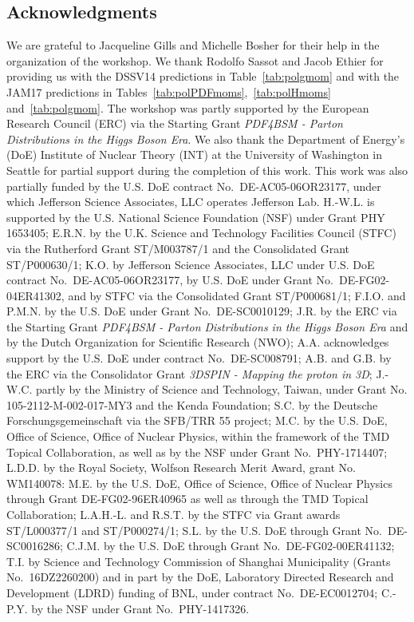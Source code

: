 \subsection*{Acknowledgments}

We are grateful to Jacqueline Gills and Michelle Bosher for their help in the
organization of the workshop.
%
We thank Rodolfo Sassot and Jacob Ethier for providing us with the 
DSSV14 predictions in Table~\ref{tab:polgmom} and with the JAM17 predictions in
Tables~\ref{tab:polPDFmoms},~\ref{tab:polHmoms} and~\ref{tab:polgmom}.
%
The workshop was partly supported by the European Research Council (ERC) via 
the Starting Grant {\it PDF4BSM - Parton Distributions in the Higgs Boson Era}.
%
We also thank the Department of Energy's (DoE) Institute of Nuclear Theory 
(INT) at the University of Washington in Seattle for partial support during 
the completion of this work.
%
This work was also partially funded by the U.S. DoE contract 
No.~DE-AC05-06OR23177, under which Jefferson Science Associates, 
LLC operates Jefferson Lab. 
% 
H.-W.L. is supported by the U.S. National Science Foundation (NSF) under Grant 
PHY 1653405; E.R.N. by the U.K. Science and Technology Facilities Council 
(STFC) via the Rutherford Grant ST/M003787/1 and the Consolidated Grant 
ST/P000630/1; K.O. by Jefferson Science Associates, LLC under U.S. 
DoE contract No.~DE-AC05-06OR23177, 
by U.S. DoE under Grant No.~DE-FG02-04ER41302, 
and by STFC via the Consolidated Grant ST/P000681/1; 
F.I.O. and P.M.N. by the U.S. 
DoE under Grant No.~DE-SC0010129; J.R. by the ERC via the Starting 
Grant {\it PDF4BSM - Parton Distributions in the Higgs Boson Era} and by the 
Dutch Organization for Scientific Research (NWO);
%
A.A. acknowledges support by the U.S. DoE under contract No.~DE-SC008791;
A.B. and G.B. by the ERC via the Consolidator Grant {\it 3DSPIN - Mapping the
proton in 3D};
J.-W.C. partly by the Ministry of Science and Technology, Taiwan,
under Grant No. 105-2112-M-002-017-MY3 and the Kenda Foundation;
S.C. by the Deutsche Forschungsgemeinschaft via the SFB/TRR 55 project;
M.C. by the U.S. DoE, Office of Science, Office of Nuclear Physics, within the 
framework of the TMD Topical Collaboration, as well as by the NSF under Grant 
No.~PHY-1714407;
L.D.D. by the Royal Society, Wolfson Research Merit Award,
grant No. WM140078:
M.E. by the U.S. DoE, Office of Science, Office of Nuclear Physics through 
Grant DE-FG02-96ER40965 as well as through the TMD Topical Collaboration;
L.A.H.-L. and R.S.T. by the STFC via Grant awards ST/L000377/1 and ST/P000274/1;
S.L. by the U.S. DoE through Grant No.~DE-SC0016286;
C.J.M. by the U.S. DoE through Grant No.~DE-FG02-00ER41132;
T.I. by Science and Technology Commission of Shanghai Municipality 
(Grants No.~16DZ2260200) and in part by the DoE, Laboratory Directed Research 
and Development (LDRD) funding of BNL, under contract No.~DE-EC0012704;
C.-P.Y. by the NSF under Grant No.~PHY-1417326.



